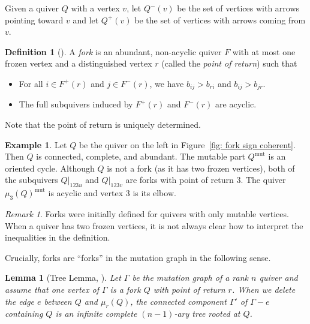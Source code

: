 \documentclass[12pt]{amsart}
\newtheorem{lem}[thm]{Lemma}
\theoremstyle{definition}
\newtheorem{defn}[thm]{Definition}
\newtheorem{exmp}[thm]{Example}
\theoremstyle{remark}
\newtheorem{rem}[thm]{Remark}
\numberwithin{equation}{section}
\newcommand{\mut} {\text{mut}}
\begin{document}
Given a quiver $Q$ with a vertex $v$, let $Q^-(v)$ be the set of vertices with arrows pointing toward $v$ and let $Q^+(v)$ be the set of vertices with arrows coming from $v$.

\begin{defn}[{\cite[Definition 2.1]{Warkentin}}]
\label{def:fork}
A \emph{fork} is an abundant, non-acyclic quiver $F$ with at most one frozen vertex and a distinguished vertex $r$ (called the \emph{point of return}) such that 
\begin{itemize}
\item For all $i \in F^+(r)$ and $j \in F^-(r)$, we have $b_{ij} > b_{ri}$ and $b_{ij} > b_{jr}$.
\item The full subquivers induced by $F^+(r)$ and $F^-(r)$ are acyclic.
\end{itemize}
\end{defn}

Note that the point of return is uniquely determined.  

\begin{exmp}
\label{eg: it is an ice fork}
Let $Q$ be the quiver on the left in Figure~\ref{fig: fork sign coherent}.
Then $Q$ is connected, complete, and abundant. The mutable part $Q^{\mut}$ is an oriented cycle.
Although $Q$ is not a fork (as it has two frozen vertices), both of the subquivers $Q|_{123u}$ and $Q|_{123v}$ are forks with point of return $3$.
The quiver $\mu_3(Q)^{\mut}$ is acyclic and vertex $3$ is its elbow.
\end{exmp}

\begin{rem}
Forks were initially defined for quivers with only mutable vertices.
When a quiver has two frozen vertices, it is not always clear how to interpret the inequalities in the definition.
\end{rem}


Crucially, forks are ``forks'' in the mutation graph in the following sense.

\begin{lem}[Tree Lemma, {\cite[Lemma 2.8]{Warkentin}}]
\label{lem:tree lemma}
Let $\Gamma$ be the mutation graph of a rank $n$ quiver and assume that one vertex of $\Gamma$ is a fork $Q$ with point of return $r$.  When we delete the edge $e$ between $Q$ and $\mu_r(Q)$, the connected component $\Gamma'$ of $\Gamma - e$ containing $Q$
 is an infinite complete $(n-1)$-ary tree rooted at $Q$. \end{lem}
\end{document}
